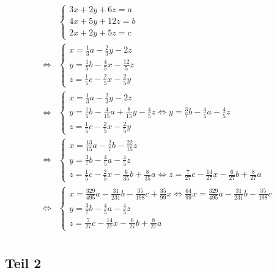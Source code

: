\documentclass[a4paper,10pt]{article}
\begin{document}
\begin{align*}
 & \begin{cases}
  3x + 2y + 6z = a\\
  4x + 5y + 12z = b\\
  2x + 2y + 5z = c
 \end{cases}\\
 \Leftrightarrow & 
 \begin{cases}
  x = \frac{1}{3}a - \frac{2}{3}y - 2z\\
  y = \frac{1}{5}b - \frac{4}{5}x - \frac{12}{5}z\\
  z = \frac{1}{5}c - \frac{2}{5}x - \frac{2}{5}y
 \end{cases}\\
 \Leftrightarrow & 
 \begin{cases}
  x = \frac{1}{3}a - \frac{2}{3}y - 2z\\
  y = \frac{1}{5}b - \frac{4}{15}a + \frac{8}{15}y - \frac{4}{5}z \Leftrightarrow y = \frac{3}{7}b - \frac{4}{5}a - \frac{4}{5}z\\
  z = \frac{1}{5}c - \frac{2}{5}x - \frac{2}{5}y
 \end{cases}\\
 \Leftrightarrow & 
 \begin{cases}
  x = \frac{13}{15}a - \frac{2}{7}b - \frac{22}{15}z\\
  y = \frac{3}{7}b - \frac{4}{5}a - \frac{4}{5}z\\
  z = \frac{1}{5}c - \frac{2}{5}x - \frac{6}{35}b + \frac{8}{35}a \Leftrightarrow z = \frac{7}{27}c - \frac{14}{27}x - \frac{6}{27}b + \frac{8}{27}a
 \end{cases}\\
 \Leftrightarrow & 
 \begin{cases}
  x = \frac{329}{495}a - \frac{31}{231}b - \frac{35}{198}c + \frac{35}{99}x \Leftrightarrow \frac{64}{99}x = \frac{329}{495}a - \frac{31}{231}b - \frac{35}{198}c\\
  y = \frac{3}{7}b - \frac{4}{5}a - \frac{4}{5}z\\
  z = \frac{7}{27}c - \frac{14}{27}x - \frac{6}{27}b + \frac{8}{27}a
 \end{cases}\\
\end{align*}

\subsection*{Teil 2}
\end{document}
